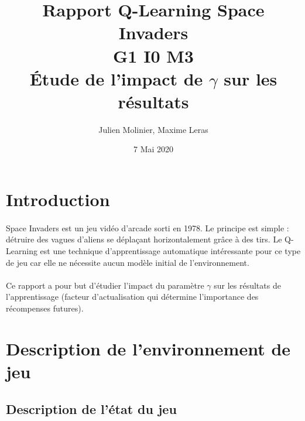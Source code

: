 \documentclass[12pt,oneside,a4paper]{article}
\begin{document}
    \title{Rapport Q-Learning Space Invaders \\ \vspace*{3mm}G1 I0 M3 \large  \vspace*{7mm}\\ Étude de l'impact de $\gamma$ sur les résultats}

    \author{Julien Molinier, Maxime Leras}
    \date{7 Mai 2020}
    \maketitle\thispagestyle{empty}

    \newpage
    \clearpage
    \thispagestyle{empty}
    \renewcommand*\contentsname{Sommaire}
    \tableofcontents
    \newpage

    \pagestyle{fancy}
    \cfoot{\thepage}
    \fancyhead{}
    \fancyhead[R]{\leftmark}



    \section{Introduction}

    \paragraph{}
    Space Invaders est un jeu vidéo d'arcade sorti en 1978. Le principe
    est simple : détruire des vagues d'aliens se déplaçant horizontalement
    grâce à des tirs.
    Le Q-Learning est une technique d'apprentissage automatique
    intéressante pour ce type de jeu car elle ne nécessite aucun modèle
    initial de l'environnement.

    \paragraph{}
    Ce rapport a pour but d'étudier l'impact du paramètre $\gamma$ sur
    les résultats de l'apprentissage (facteur d'actualisation qui détermine
    l'importance des récompenses futures).


    \section{Description de l'environnement de jeu}

    \subsection{Description de l'état du jeu}
\end{document}
